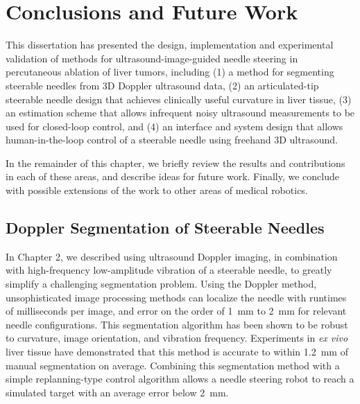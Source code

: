 \chapter[Conclusions and Future Work]{Conclusions and Future Work}
This dissertation has presented the design, implementation and experimental validation of methods for ultrasound-image-guided needle steering in percutaneous ablation of liver tumors, including (1) a method for segmenting steerable needles from 3D Doppler ultrasound data, (2) an articulated-tip steerable needle design that achieves clinically useful curvature in liver tissue, (3) an estimation scheme that allows infrequent noisy ultrasound measurements to be used for closed-loop control, and (4) an interface and system design that allows human-in-the-loop control of a steerable needle using freehand 3D ultrasound. 

In the remainder of this chapter, we briefly review the results and contributions in each of these areas, and describe ideas for future work. Finally, we conclude with possible extensions of the work to other areas of medical robotics.

\section{Doppler Segmentation of Steerable Needles}
In Chapter 2, we described using ultrasound Doppler imaging, in combination with high-frequency low-amplitude vibration of a steerable needle, to greatly simplify a challenging segmentation problem. Using the Doppler method, unsophisticated image processing methods can localize the needle with runtimes of milliseconds per image, and error on the order of 1~mm to 2~mm for relevant needle configurations. This segmentation algorithm has been shown to be robust to curvature, image orientation, and vibration frequency. Experiments in \textit{ex vivo} liver tissue have demonstrated that this method is accurate to within 1.2~mm of manual segmentation on average. Combining this segmentation method with a simple replanning-type control algorithm allows a needle steering robot to reach a simulated target with an average error below 2~mm. 

